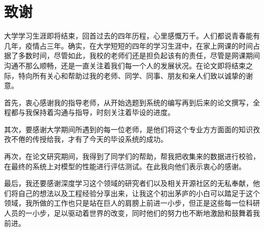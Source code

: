 \section*{致谢}

大学学习生涯即将结束，回首过去的四年历程，心里感慨万千。人们都说青春能有几年，疫情占三年。确实，在大学短短的四年的学习生涯中，在家上网课的时间占据了多数时间，尽管如此，我校的老师们还是担负起该有的责任，尽管是网课期间沟通不那么顺畅，还是一直关注着我们每一个人的发展状况。在论文即将结束之际，特向所有关心和帮助过我的老师、同学、同事、朋友和亲人们致以诚挚的谢意。

首先，衷心感谢我的指导老师，从开始选题到系统的编写再到后来的论文撰写，全程都与我保持着沟通与指导，时刻关注着毕设的进度。

其次，要感谢大学期间所遇到的每一位老师，是他们将这个专业方方面面的知识孜孜不倦的传授给我，才有了今天的毕设系统的成功。

再次，在论文研究期间，我得到了同学们的帮助，帮我把收集来的数据进行校验，在最终的系统上对模型的性能进行评估测试。在此我向他们表示衷心的感谢。

最后，我还要感谢深度学习这个领域的研究者们以及相关开源社区的无私奉献，他们将自己的想法以及工程经验分享出来，让我这个初出茅庐的小白可以踏足于这个领域，我所做的工作也只是站在巨人的肩膀上前进一小步，但正是这些每一位科研人员的一小步，足以驱动着世界的改变，同时他们的努力也不断地激励和鼓舞着我前进。
